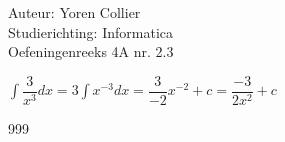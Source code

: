 \documentclass[a4paper]{article}
\newcommand{\intgrl}{\displaystyle\int} %
\begin{document}
\noindent \large Auteur: Yoren Collier \\
\noindent \large Studierichting: Informatica\\
\noindent \large Oefeningenreeks 4A nr. 2.3\\

\medskip

\normalsize

$ \intgrl \dfrac{3}{x^3} dx = 3 \intgrl x^{-3} dx = \dfrac{3}{-2} x^{-2} +c = \dfrac{-3}{2x^2} +c$\\

\begin{thebibliography}{999}
\end{thebibliography}
\end{document}
